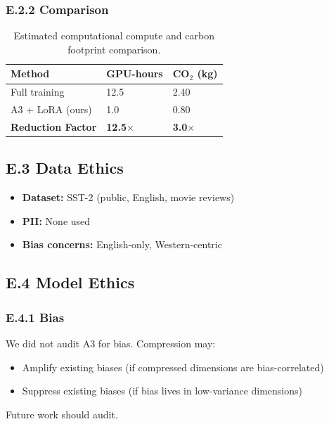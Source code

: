 \subsubsection{E.2.2 Comparison}

\begin{table}[H]
\centering
\small
\begin{tabular}{lll}
\toprule
\textbf{Method} & \textbf{GPU-hours} & \textbf{CO$_2$ (kg)} \\
\midrule
Full training & 12.5 & 2.40 \\
A3 + LoRA (ours) & 1.0 & 0.80 \\
\textbf{Reduction Factor} & \textbf{12.5$\times$} & \textbf{3.0$\times$} \\
\bottomrule
\end{tabular}
\caption{Estimated computational compute and carbon footprint comparison.}
\label{tab:app_co2_comparison}
\end{table}

\subsection{E.3 Data Ethics}

\begin{itemize}
\item \textbf{Dataset:} SST-2 (public, English, movie reviews)
\item \textbf{PII:} None used
\item \textbf{Bias concerns:} English-only, Western-centric

\end{itemize}
\subsection{E.4 Model Ethics}

\subsubsection{E.4.1 Bias}

We did not audit A3 for bias. Compression may:

\begin{itemize}
\item Amplify existing biases (if compressed dimensions are bias-correlated)
\item Suppress existing biases (if bias lives in low-variance dimensions)

\end{itemize}
Future work should audit.


